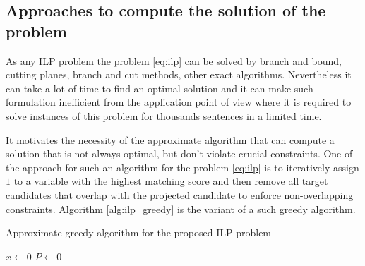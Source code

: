 \subsection{Approaches to compute the solution of the problem}
As any ILP problem the problem \eqref{eq:ilp} can be solved by branch and bound, cutting planes,
branch and cut methods, other exact algorithms. Nevertheless it can take a lot of time to find an optimal solution and
it can make such formulation inefficient from the application point of view where it is required to
solve instances of this problem for thousands sentences in a limited time.

It motivates the necessity of the approximate algorithm that can compute a solution that is not always
optimal, but don't violate crucial constraints. One of the approach for such an algorithm for the problem
\eqref{eq:ilp} is to iteratively assign \( 1 \) to a variable with the highest matching score and then remove
all target candidates that overlap with the projected candidate to enforce non-overlapping constraints.
Algorithm \ref{alg:ilp_greedy} is the variant of a such greedy algorithm.

\begin{algorithm}
  \caption{Approximate greedy algorithm for the proposed ILP problem} \label{alg:ilp_greedy}

  \( x \gets 0 \) \;
  \( P \gets 0 \) 
\end{algorithm}

